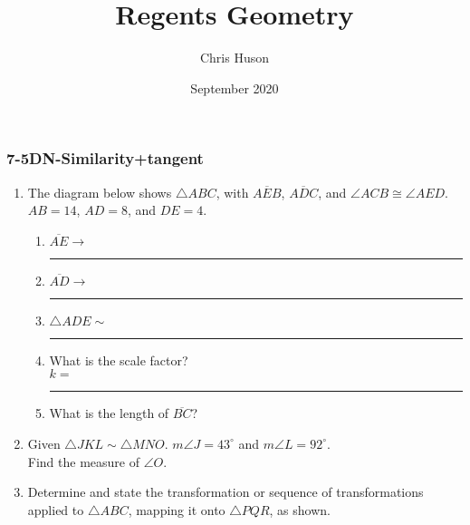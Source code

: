 \documentclass[12pt, twoside]{article}
\title{Regents Geometry}
\author{Chris Huson}
\date{September 2020}
\begin{document}
\subsubsection*{7-5DN-Similarity+tangent}
\begin{enumerate}
\item The diagram below shows $\triangle ABC$, with $\overline{AEB}$, $\overline{ADC}$, and $\angle ACB \cong \angle AED$. $AB=14$, $AD=8$, and $DE=4$.
  \begin{multicols}{2}
    \begin{enumerate}
        \item $\overline{AE} \rightarrow$ \rule{2cm}{0.15mm} \vspace{0.5cm}
        \item $\overline{AD} \rightarrow$ \rule{2cm}{0.15mm} \vspace{0.5cm}
        \item $\triangle ADE \sim$ \rule{2cm}{0.15mm} \vspace{0.5cm}
        \item What is the scale factor?\\[0.5cm] $k=$  \rule{2cm}{0.15mm}
        \item What is the length of $\overline{BC}$?
      \end{enumerate}
    \end{multicols} \vspace{1.5cm}
 
\item Given $\triangle JKL \sim \triangle MNO$. $m\angle J = 43^\circ$ and $m\angle L = 92^\circ$.\\[0.25cm]
   Find the measure of $\angle O$. \vspace{1.cm}

\item Determine and state the transformation or sequence of transformations  applied to $\triangle ABC$, mapping it onto $\triangle PQR$, as shown.
   \begin{flushright}
\end{flushright}
\end{enumerate}
\end{document}
